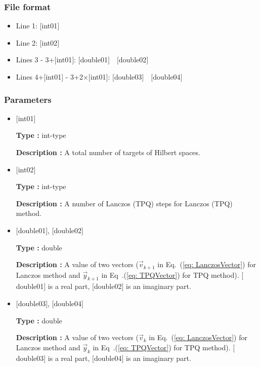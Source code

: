 \subsubsection{File format}
 \begin{itemize}
   \item  Line 1: $[$int01$]$
   \item  Line 2: $[$int02$]$
   \item  Lines 3 - 3+$[$int01$]$: $[$double01$]$~~$[$double02$]$
   \item  Lines 4+$[$int01$]$ - 3+2$\times[$int01$]$: $[$double03$]$~~$[$double04$]$
  \end{itemize}

\subsubsection{Parameters}
 \begin{itemize}

  \item  $[$int01$]$

 {\bf Type :} int-type

{\bf Description :}  A total number of targets of Hilbert spaces.

  \item  $[$int02$]$

 {\bf Type :} int-type

{\bf Description :}  { A number of Lanczos (TPQ) steps for Lanczos (TPQ) method.}

 \item  $[$double01$]$, $[$double02$]$ 

 {\bf Type :} double 

{\bf Description :} A value of two vectors ($\vec{v}_{k+1}$ in Eq.~(\ref{eq: LanczosVector}) for Lanczos method and $\vec{y}_{k+1}$ in Eq~.(\ref{eq: TPQVector}) for TPQ method). $[$double01$]$ is a real part, $[$double02$]$ is an imaginary part.

 \item  $[$double03$]$, $[$double04$]$ 

 {\bf Type :} double 

{\bf Description :} A value of two vectors ($\vec{v}_{k}$ in Eq.~(\ref{eq: LanczosVector}) for Lanczos method and $\vec{y}_{k}$ in Eq~.(\ref{eq: TPQVector}) for TPQ method). $[$double03$]$ is a real part, $[$double04$]$ is an imaginary part.\\

 \end{itemize}

